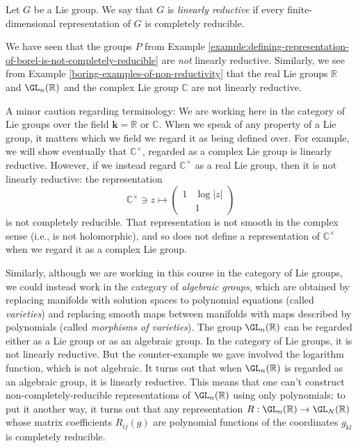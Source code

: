 \documentclass[reqno]{amsart} 
\begin{document}
\begin{definition}
  Let $G$ be a Lie group.
  We say that $G$ is \emph{linearly reductive}
  if every finite-dimensional representation
  of $G$ is completely reducible.
\end{definition}

\begin{example}\label{rmk:lie-vs-alg}
  We have seen that the groups $P$ from 
  Example
  \ref{example:defining-representation-of-borel-is-not-completely-reducible}
  are \emph{not} linearly reductive.
  Similarly,
  we see from Example \ref{boring-examples-of-non-reductivity}
  that the real Lie groups $\mathbb{R}$ and
  $\GL_n(\mathbb{R})$
  and the complex Lie group $\mathbb{C}$ are not linearly
  reductive.

  A minor caution regarding terminology: We are working here in
  the category of Lie groups over the field $\mathbf{k} =
  \mathbb{R}$ or $\mathbb{C}$.
  When we speak of any property of a Lie group, it matters
  which we field
  we regard it as being defined over.
  For example, we will show eventually that 
  $\mathbb{C}^\times$,
  regarded as a complex Lie group
  is linearly reductive.
  However, if we instead regard $\mathbb{C}^\times$ as a
  real Lie group,
  then it is not linearly reductive:
  the representation
  \begin{equation*}
    \mathbb{C}^\times \ni z
    \mapsto 
\begin{pmatrix}
      1 & \log |z| \\
       & 1
    \end{pmatrix}
  \end{equation*}
  is not completely reducible.
  That representation is not smooth in the complex
  sense (i.e., is not holomorphic), and so does not define
  a representation of $\mathbb{C}^\times$ when we regard
  it as a complex Lie group.

  Similarly, although we are working 
  in this course in the category of Lie groups,
  we could instead work in the
  category of \emph{algebraic groups}, which are obtained by
  replacing manifolds with solution spaces to polynomial
  equations (called \emph{varieties}) and replacing smooth maps
  between manifolds with maps described by polynomials (called
  \emph{morphisms of varieties}).  The group
  $\GL_n(\mathbb{R})$ can be regarded either as a Lie group or
  as an algebraic group.  In the category of Lie groups, it is
  not linearly reductive.  But the counter-example we gave
  involved the logarithm function, which is not algebraic.  It
  turns out that when $\GL_n(\mathbb{R})$ is regarded as an
  algebraic group, it is linearly reductive.  This
  means that one can't construct non-completely-reducible
  representations of $\GL_n(\mathbb{R})$ using only polynomials;
  to put it another way, it turns out that any representation
  $R : \GL_n(\mathbb{R}) \rightarrow \GL_N(\mathbb{R})$ whose
  matrix coefficients $R_{i j}(g)$ are polynomial functions of
  the coordinates $g_{k l}$ is completely reducible.
\end{example}
\end{document}
